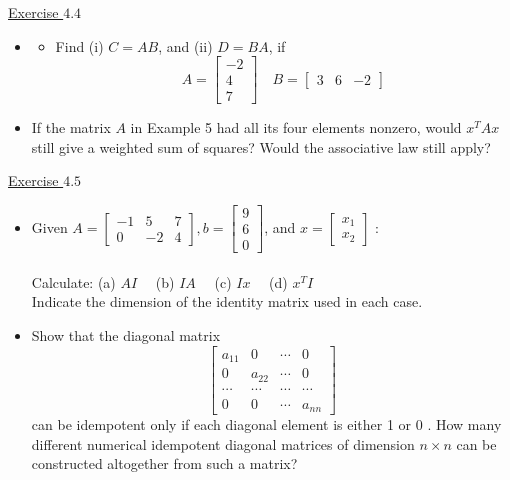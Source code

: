 \underline{Exercise $4.4$}
\begin{itemize}

\item[5.]
\begin{itemize}
\item[(e)] Find (i) $C=A B$, and (ii) $D=B A$, if
\[
A=\left[\begin{array}{r}
-2 \\
4 \\
7
\end{array}\right] \quad B=\left[\begin{array}{lll}
3 & 6 & -2
\end{array}\right]
\]
\end{itemize}

\item[7.] If the matrix $A$ in Example 5 had all its four elements nonzero, would $x^T A x$ still give a weighted sum of squares? Would the associative law still apply? \\
\end{itemize}


\underline{Exercise $4.5$}
\begin{itemize}
\item[1.] Given $A=\left[\begin{array}{rrr}-1 & 5 & 7 \\ 0 & -2 & 4\end{array}\right], b=\left[\begin{array}{l}9 \\ 6 \\ 0\end{array}\right]$, and $x=\left[\begin{array}{l}x_1 \\ x_2\end{array}\right]$ : \\~\\
Calculate: (a) $AI \quad$ (b) $I A \quad$ (c) $I x \quad$ (d) $x^T I$ \\
Indicate the dimension of the identity matrix used in each case.

\item[4.] Show that the diagonal matrix
\[
\left[\begin{array}{cccc}
a_{11} & 0 & \cdots & 0 \\
0 & a_{22} & \cdots & 0 \\
\cdots  & \cdots & \cdots & \cdots  \\
0 & 0 & \cdots & a_{n n}
\end{array}\right]
\]
can be idempotent only if each diagonal element is either 1 or 0 . How many different numerical idempotent diagonal matrices of dimension $n \times n$ can be constructed altogether from such a matrix? \\
\end{itemize}

